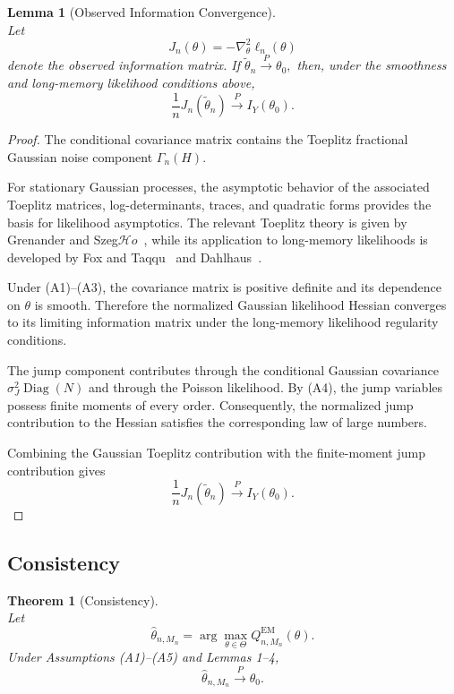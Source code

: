 \documentclass[a4paper,11pt]{amsart}
\newtheorem{theorem}{Theorem}
\newtheorem{lemma}{Lemma}
\theoremstyle{definition}
\theoremstyle{plain}
\theoremstyle{remark}
\renewcommand{\H}{\mathcal{H}}
\newcommand{\1}{\mathbf{1}}
\begin{document}
\begin{lemma}[Observed Information Convergence]\mbox{}\\
Let
$$
J_n(\theta)
=
-\nabla_\theta^2\ell_n(\theta)
$$
denote the observed information matrix. If  
$
\widetilde\theta_n
\xrightarrow{P}
\theta_0,
$ then, under the smoothness and long-memory likelihood conditions above,
$$
\frac1nJ_n(\widetilde\theta_n)
\xrightarrow{P}
I_Y(\theta_0).
$$
\end{lemma}

\begin{proof}
The conditional covariance matrix contains the Toeplitz fractional Gaussian noise component
$\Gamma_n(H).$

For stationary Gaussian processes, the asymptotic behavior of the associated Toeplitz matrices, log-determinants, traces, and quadratic forms provides the basis for likelihood asymptotics. The relevant Toeplitz theory is given by Grenander and Szeg$\H{o}$~\cite{GrenanderSzego1958}, while its application to long-memory likelihoods is developed by Fox and Taqqu~\cite{FoxTaqqu1986} and Dahlhaus~\cite{Dahlhaus1989}.

Under (A1)--(A3), the covariance matrix is positive definite and its dependence on $\theta$ is smooth. Therefore the normalized Gaussian likelihood Hessian converges to its limiting information matrix under the long-memory likelihood regularity conditions.

The jump component contributes through the conditional Gaussian covariance
$
\sigma_J^2\operatorname{Diag}(N)
$ and through the Poisson likelihood. By (A4), the jump variables possess finite moments of every order. Consequently, the normalized jump contribution to the Hessian satisfies the corresponding law of large numbers.

Combining the Gaussian Toeplitz contribution with the finite-moment jump contribution gives
$$
\frac1nJ_n(\widetilde\theta_n)
\xrightarrow{P}
I_Y(\theta_0).
$$
\end{proof}

\subsection{Consistency}

\begin{theorem}[Consistency]\mbox{}\\
Let
$$
\widehat\theta_{n,M_n}
=
\arg\max_{\theta\in\Theta}
Q_{n,M_n}^{\mathrm{EM}}(\theta).
$$
Under Assumptions (A1)--(A5) and Lemmas 1--4,
$$
\widehat\theta_{n,M_n}
\xrightarrow{P}
\theta_0.
$$
\end{theorem}
\end{document}
